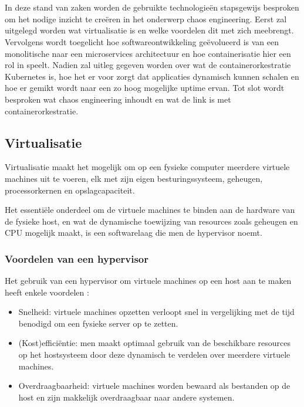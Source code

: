 \chapter{}
\label{ch:stand-van-zaken}


In deze stand van zaken worden de gebruikte technologieën stapsgewijs besproken om het nodige inzicht te creëren in het onderwerp chaos engineering. Eerst zal uitgelegd worden wat virtualisatie is en welke voordelen dit met zich meebrengt.
Vervolgens wordt toegelicht hoe softwareontwikkeling geëvolueerd is van een monolitische naar een microservices architectuur en hoe containerisatie hier een rol in speelt. Nadien zal uitleg gegeven worden over wat de containerorkestratie Kubernetes is, hoe het er voor zorgt dat applicaties dynamisch kunnen schalen en hoe er gemikt wordt naar een zo hoog mogelijke uptime ervan. Tot slot wordt besproken wat chaos engineering inhoudt en wat de link is met containerorkestratie.   

\section{Virtualisatie}

Virtualisatie maakt het mogelijk om op een fysieke computer meerdere virtuele machines uit te voeren, elk met zijn eigen besturingssysteem, geheugen, processorkernen en opslagcapaciteit.

Het essentiële onderdeel om de virtuele machines te binden aan de hardware van de fysieke host, en wat de dynamische toewijzing van resources zoals geheugen en CPU mogelijk maakt, is een softwarelaag die men de hypervisor noemt. 

\subsection{Voordelen van een hypervisor}

Het gebruik van een hypervisor om virtuele machines op een host aan te maken heeft enkele voordelen \autocite{Yfantis2020} :
\begin{itemize}
    \item Snelheid: virtuele machines opzetten verloopt snel in vergelijking met de tijd benodigd om een fysieke server op te zetten.
    \item (Kost)efficiëntie: men maakt optimaal gebruik van de beschikbare resources op het hostsysteem door deze dynamisch te verdelen over meerdere virtuele machines.   
    \item Overdraagbaarheid: virtuele machines worden bewaard als bestanden op de host en zijn makkelijk overdraagbaar naar andere systemen.
\end{itemize}


